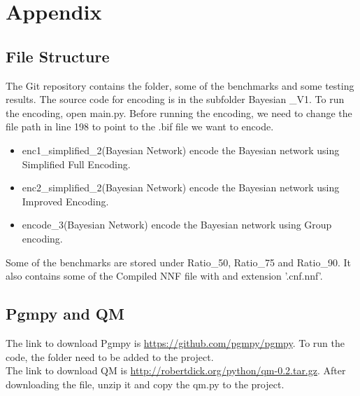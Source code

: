 \newpage
\appendix
\section*{Appendix}
\subsection{File Structure}
The Git repository contains the folder, some of the benchmarks and some testing results. The source code for encoding is in the subfolder Bayesian \_V1. To run the encoding, open main.py. Before running the encoding, we need to change the file path in line 198 to point to the .bif file we want to encode. \\
\begin{itemize}
    \item enc1\_simplified\_2(Bayesian Network) encode the Bayesian network using Simplified Full Encoding.
    \item enc2\_simplified\_2(Bayesian Network) encode the Bayesian network using Improved Encoding.
    \item encode\_3(Bayesian Network) encode the Bayesian network using Group encoding.
\end{itemize}

\noindent Some of the benchmarks are stored under Ratio\_50, Ratio\_75 and Ratio\_90. It also contains some of the Compiled NNF file with and extension '.cnf.nnf'.

\subsection*{Pgmpy and QM}
The link to download Pgmpy is \url{https://github.com/pgmpy/pgmpy}. To run the code, the folder need to be added to the project.\\

The link to download QM is \url{http://robertdick.org/python/qm-0.2.tar.gz}. After downloading the file, unzip it and copy the qm.py to the project.


